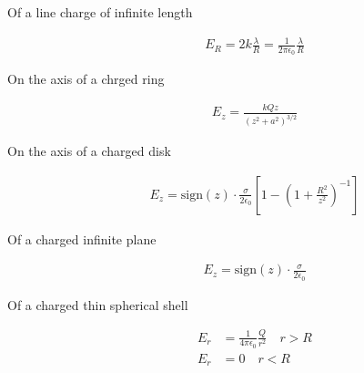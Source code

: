 \documentclass[../main.tex]{subfiles}
\begin{document}
\begin{description}
  \item[Of a line charge of infinite length]
    \begin{align}
      E_R = 2k\frac{\lambda}{R} = \frac{1}{2\pi\epsilon_0}\frac{\lambda}{R}
    \end{align}
  \item[On the axis of a chrged ring]
    \begin{align}
      E_z = \frac{kQz}{{\left(z^2+a^2\right)}^{3/2}}
    \end{align}
  \item[On the axis of a charged disk]
    \begin{align}
      E_z = \text{sign}(z) \cdot \frac{\sigma}{2\epsilon_0} 
      \left[1-{\left(1+\frac{R^2}{z^2}\right)}^{-1}\right]
    \end{align}
  \item[Of a charged infinite plane]
    \begin{align}
      E_z = \text{sign}(z)\cdot\frac{\sigma}{2\epsilon_0}
    \end{align}
  \item[Of a charged thin spherical shell]
    \begin{align}
      E_r &= \frac{1}{4\pi\epsilon_0}\frac{Q}{r^2}\quad r > R\\
      E_r &= 0\quad r < R
    \end{align}
\end{description}
\end{document}
